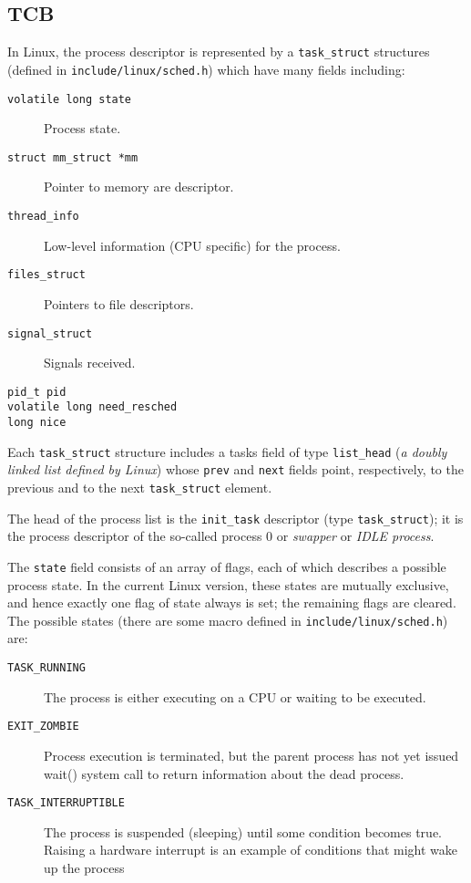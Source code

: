 \documentclass[10pt,a4paper]{article}
\begin{document}
\subsection{TCB}

In Linux, the process descriptor is represented by a \texttt{task\_struct} structures (defined in \texttt{include/linux/sched.h}) which have many fields including:

\begin{description}
\item[\texttt{volatile long state}] Process state.
\item[\texttt{struct mm\_struct *mm}] Pointer to memory are descriptor.
\item[\texttt{thread\_info}] Low-level information (CPU specific) for the process.
\item[\texttt{files\_struct}] Pointers to file descriptors.
\item[\texttt{signal\_struct}] Signals received.
\item[\texttt{pid\_t pid}]
\item[\texttt{volatile long need\_resched}]
\item[\texttt{long nice}]
\end{description}

Each \texttt{task\_struct} structure includes a tasks field of type \texttt{list\_head} (\textit{a doubly linked list defined by Linux}) whose \texttt{prev} and \texttt{next} fields point, respectively, to the previous and to the next \texttt{task\_struct} element.

The head of the process list is the \texttt{init\_task} descriptor (type \texttt{task\_struct}); it is the process descriptor of the so-called process 0 or \textit{swapper} or \textit{IDLE process}.

The \texttt{state} field consists of an array of flags, each of which describes a possible process state. In the current Linux version, these states are mutually exclusive, and hence exactly one flag of state always is set; the remaining flags are cleared. The possible states (there are some macro defined in \texttt{include/linux/sched.h}) are:
\begin{description}
\item[\texttt{TASK\_RUNNING}] The process is either executing on a CPU or waiting to be executed.
\item[\texttt{EXIT\_ZOMBIE}] Process execution is terminated, but the parent process has not yet issued wait() system call to return information about the dead process.
\item[\texttt{TASK\_INTERRUPTIBLE}] The process is suspended (sleeping) until some condition becomes true. Raising a hardware interrupt is an example of conditions that might wake up the process
\end{description}
\end{document}
